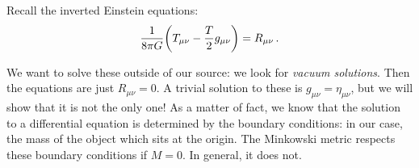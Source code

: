 \documentclass[main.tex]{subfiles}
\begin{document}
Recall the inverted Einstein equations: 
%
\begin{align}
  \frac{1}{8 \pi G} \qty(T_{\mu \nu } - \frac{T}{2} g_{\mu \nu }) = R_{\mu \nu }
\,.
\end{align}
%

We want to solve these outside of our source: we look for \emph{vacuum solutions}. Then the equations are just \(R_{\mu \nu } =0\).
A trivial solution to these is \(g_{\mu \nu } = \eta_{\mu \nu }\), but we will show that it is not the only one!
As a matter of fact, we know that the solution to a differential equation is determined by the boundary conditions: in our case, the mass of the object which sits at the origin.
The Minkowski metric respects these boundary conditions if \(M=0\). In general, it does not.
\end{document}

